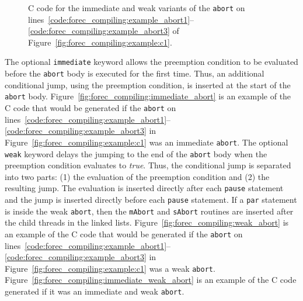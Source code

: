 \begin{figure}
	\centering

	\begin{minipage}{0.28\columnwidth}
		\vspace{0.67cm}
	\end{minipage}
	\hfill
	\begin{minipage}{0.25\columnwidth}
		\vspace{0.67cm}
	\end{minipage}
	\hfill
	\begin{minipage}{0.31\columnwidth}
	\end{minipage}

	\caption{C code for the immediate and weak variants of the \texttt{abort} on 
			lines~\ref{code:forec_compiling:example_abort1}--\ref{code:forec_compiling:example_abort3} 
			of Figure~\ref{fig:forec_compiling:example:c1}.}
\end{figure}

The optional \verb$immediate$ keyword allows the preemption
condition to be evaluated before the \verb$abort$ body is
executed for the first time. Thus, an additional conditional 
jump, using the preemption condition, is inserted at the 
start of the \verb$abort$ body. Figure~\ref{fig:forec_compiling:immediate_abort}
is an example of the C code that would be generated if the \verb$abort$ on 
lines~\ref{code:forec_compiling:example_abort1}--\ref{code:forec_compiling:example_abort3} 
in Figure~\ref{fig:forec_compiling:example:c1} was 
an immediate \verb$abort$.
The optional \verb$weak$ keyword delays the jumping to the 
end of the \verb$abort$ body when the preemption condition
evaluates to \emph{true}. Thus, the conditional jump is separated
into two parts: (1) the evaluation of the preemption condition
and (2) the resulting jump. The evaluation is inserted directly 
after each \verb$pause$ statement and the jump is inserted 
directly before each \verb$pause$ statement. If a \verb$par$ 
statement is inside the weak \verb$abort$, then the 
\verb$mAbort$ and \verb$sAbort$ routines are inserted after 
the child threads in the linked lists. 
Figure~\ref{fig:forec_compiling:weak_abort}
is an example of the C code that would be generated if the \verb$abort$ on 
lines~\ref{code:forec_compiling:example_abort1}--\ref{code:forec_compiling:example_abort3} 
in Figure~\ref{fig:forec_compiling:example:c1} was 
a weak \verb$abort$. 
Figure~\ref{fig:forec_compiling:immediate_weak_abort} 
is an example of the C code generated if it was an 
immediate and weak \verb$abort$.


